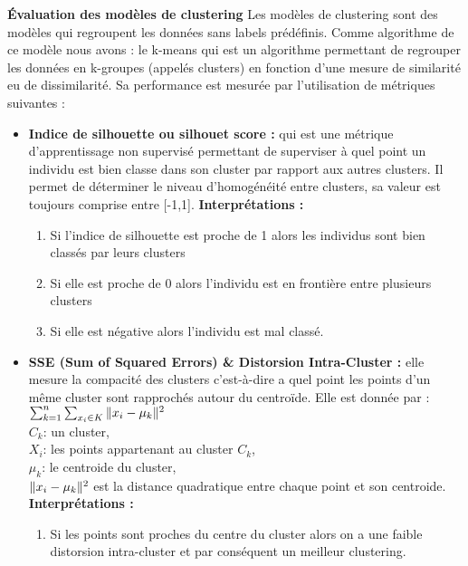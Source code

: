 \documentclass[a4paper, 12pt]{article}
\begin{document}
\begin{enumerate}
		\textbf{Évaluation des modèles de clustering} Les modèles de clustering sont des modèles qui regroupent les données sans labels prédéfinis. Comme algorithme de ce modèle nous avons : le k-means qui est un algorithme permettant de regrouper les données en k-groupes (appelés clusters) en fonction d’une mesure de similarité eu de dissimilarité. Sa performance est mesurée par l’utilisation de métriques suivantes :
		\begin{itemize}
			\item \justifying \textbf{Indice de silhouette ou silhouet score :} qui est une métrique d’apprentissage non supervisé permettant de superviser à quel point un individu est bien classe dans son cluster par rapport aux autres clusters. Il permet de déterminer le niveau d’homogénéité entre clusters, sa valeur est toujours comprise entre [-1,1].\newline
			\textbf{Interprétations :}\\\begin{enumerate}
				\item[] \justifying	Si l’indice de silhouette est proche de 1 alors les individus sont bien classés par leurs clusters
				\item \justifying 	Si elle est proche de 0 alors l’individu est en frontière entre plusieurs clusters
				\item \justifying Si elle est négative alors l’individu est mal classé.
			\end{enumerate}
			\item \justifying \textbf{SSE (Sum of Squared Errors) \& Distorsion Intra-Cluster :} elle mesure la compacité des clusters c’est-à-dire a quel  point les points d’un même cluster sont rapprochés autour du centroïde. Elle est donnée par : $\sum_{k=1}^{n}\sum_{x_{i}\in K}\Arrowvert x_{i}-\mu_{k}\Arrowvert^{2}$\\
			$C_{k}$: un cluster,\\
			$X_{i}$: les points appartenant au cluster $C_{k}$, \\
			$\mu_{k}$: le centroide du cluster,\\
			$\Arrowvert x_{i}-\mu_{k}\Arrowvert^{2} $ est la distance quadratique entre chaque point et son centroide.\\\textbf{Interprétations :}\\
			\begin{enumerate}
				\item \justifying Si les points sont proches du centre du cluster alors on a une faible distorsion intra-cluster et par conséquent un meilleur clustering.

\end{enumerate}
\end{itemize}
\end{enumerate}
\end{document}
